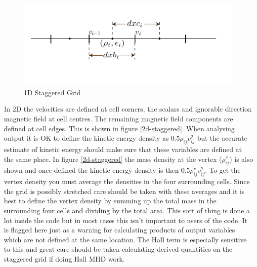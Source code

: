 \documentclass[11pt]{article}
\begin{document}
\begin{figure}
\begin{center} 
  \includegraphics{1d-staggered-grid.pdf} 
\caption{1D Staggered Grid}  
\end{center} 
\label{1d-staggered}
\end{figure}

In 2D the velocities are defined at cell corners, the scalars and ignorable direction magnetic field at cell centres. The remaining magnetic field components are defined at cell edges. This is shown in figure \ref{2d-staggered}. When analysing output it is OK to define the kinetic energy density as $0.5\rho_{ij}v_{ij}^2$ but the accurate estimate of kinetic energy should make sure that these variables are defined at the same place. In figure \ref{2d-staggered} the mass density at the vertex ($\rho_{ij}^v$) is also shown and once defined the kinetic energy density is then  $0.5\rho_{ij}^v v_{ij}^2$. To get the vertex density you must average the densities in the four surrounding cells. Since the grid is possibly stretched care should be taken with these averages and it is best to define the vertex density by summing up the total mass in the surrounding four cells and dividing by the total area. This sort of thing is done a lot inside the code but in most cases this isn't important to users of the code. It is flagged here just as a warning for calculating products of output variables which are not defined at the same location. The Hall term is especially sensitive to this and great care should be taken calculating derived quantities on the staggered grid if doing Hall MHD work.
\end{document}
